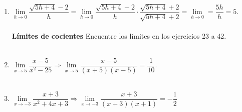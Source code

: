 \begin{enumerate}

\item $\lim\limits_{h\to 0} \dfrac{\sqrt{5h+4}-2}{h} = \lim\limits_{h\to 0} \dfrac{\sqrt{5h+4}-2}{h} \cdot \dfrac{\sqrt{5h+4}+2}{\sqrt{5h+4}+2} = \lim\limits_{h\to 0} = \dfrac{5h}{h} = 5$.\\\\

\textbf{Límites de cocientes} Encuentre los límites en los ejercicios 23 a 42.\\\\

\item $\lim\limits_{x\to 5} \dfrac{x-5}{x^2 - 25} \Longrightarrow \lim\limits_{x\to 5}\dfrac{x-5}{(x+5)(x-5)} = \dfrac{1}{10}$.\\\\

\item $\lim\limits_{x\to -3} \dfrac{x+3}{x^2 + 4x + 3} \Longrightarrow \lim\limits_{x\to -3} \dfrac{x+3}{(x+3)(x+1)} = -\dfrac{1}{2}$\\\\


\end{enumerate}
